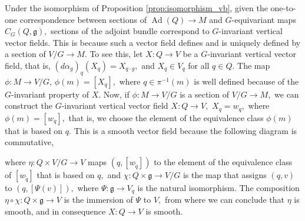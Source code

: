 \documentclass[12pt, letterpaper, reqno]{amsart}
\theoremstyle{definition}
\theoremstyle{plain}
\theoremstyle{remark}
\begin{document}
Under the isomorphism of Proposition \ref{prop:isomorphism_vb}, given the one-to-one correspondence between sections of $ \operatorname{Ad} (Q)\rightarrow M $ and $ G $-equivariant maps $ C_G(Q, \mathfrak{g}), $ sections of the adjoint bundle correspond to $ G $-invariant vertical vector fields. This is because such a vector field defines and is uniquely defined by a section of $ V/G \rightarrow M. $ To see this, let $ X: Q \rightarrow V $ be a $ G $-invariant vertical vector field, that is, $ (d\alpha_g)_q(X_q) = X_{q\cdot g}, $ and $ X_q\in V_q $ for all $ q\in Q. $ The map $ \phi: M \rightarrow V/G $, $ \phi(m)= [X_q], $ where $ q\in \pi^{-1}(m) $ is well defined because of the $ G $-invariant property of $ X. $ Now, if $ \phi: M \rightarrow V/G $ is a section of $ V/G \rightarrow M, $ we can construct the $ G $-invariant vertical vector field $ X: Q \rightarrow V, $ $ X_q=w_q, $ where $ \phi(m)=[w_q], $ that is, we choose the element of the equivalence class $ \phi(m) $ that is based on $ q. $ This is a smooth vector field because the following diagram is commutative,
\begin{center}
\end{center}
where $ \eta: Q\times V/G \rightarrow V $ maps $ (q, [w_{\tilde q}]) $ to the element of the equivalence class of $ [w_{\tilde q}] $ that is based on $ q, $ and $ \chi: Q\times\mathfrak{g}\rightarrow V/G $ is the map that assigns $(q,v)$ to $ (q, [\Psi(v)]), $ where $ \Psi: \mathfrak{g} \rightarrow V_q $ is the natural isomorphism. The composition $ \eta\circ\chi: Q\times \mathfrak{g} \rightarrow V $ is the immersion of $ \Psi $ to $ V, $ from where we can conclude that $ \eta $ is smooth, and in consequence $ X:Q \rightarrow V $ is smooth.
\end{document}
